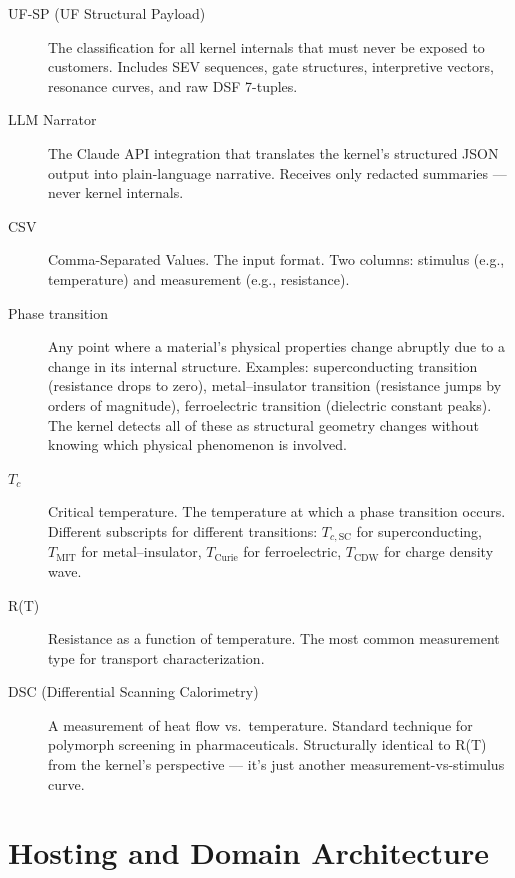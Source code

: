 \documentclass[11pt,letterpaper]{article}
\begin{document}
\begin{description}
  \item[UF-SP (UF Structural Payload)] The classification for all
    kernel internals that must never be exposed to customers.
    Includes SEV sequences, gate structures, interpretive vectors,
    resonance curves, and raw DSF 7-tuples.

  \item[LLM Narrator] The Claude API integration that translates the
    kernel's structured JSON output into plain-language narrative.
    Receives only redacted summaries --- never kernel internals.

  \item[CSV] Comma-Separated Values. The input format. Two columns:
    stimulus (e.g., temperature) and measurement (e.g., resistance).

  \item[Phase transition] Any point where a material's physical
    properties change abruptly due to a change in its internal
    structure. Examples: superconducting transition (resistance
    drops to zero), metal--insulator transition (resistance jumps
    by orders of magnitude), ferroelectric transition (dielectric
    constant peaks). The kernel detects all of these as structural
    geometry changes without knowing which physical phenomenon is
    involved.

  \item[$T_c$] Critical temperature. The temperature at which a
    phase transition occurs. Different subscripts for different
    transitions: $T_{c,\text{SC}}$ for superconducting,
    $T_{\text{MIT}}$ for metal--insulator, $T_{\text{Curie}}$ for
    ferroelectric, $T_{\text{CDW}}$ for charge density wave.

  \item[R(T)] Resistance as a function of temperature. The most
    common measurement type for transport characterization.

  \item[DSC (Differential Scanning Calorimetry)] A measurement of
    heat flow vs.\ temperature. Standard technique for polymorph
    screening in pharmaceuticals. Structurally identical to R(T)
    from the kernel's perspective --- it's just another
    measurement-vs-stimulus curve.

\end{description}

\section{Hosting and Domain Architecture}
\end{document}
